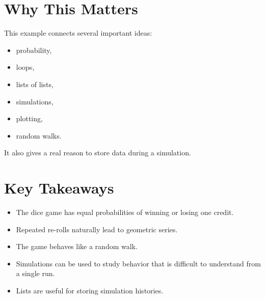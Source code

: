 \documentclass[11pt]{article}
\begin{document}
\section{Why This Matters}

This example connects several important ideas:

\begin{itemize}
    \item probability,
    \item loops,
    \item lists of lists,
    \item simulations,
    \item plotting,
    \item random walks.
\end{itemize}

It also gives a real reason to store data during a simulation.

\section{Key Takeaways}

\begin{itemize}
    \item The dice game has equal probabilities of winning or losing one credit.
    \item Repeated re-rolls naturally lead to geometric series.
    \item The game behaves like a random walk.
    \item Simulations can be used to study behavior that is difficult to understand from a single run.
    \item Lists are useful for storing simulation histories.
\end{itemize}
\end{document}
